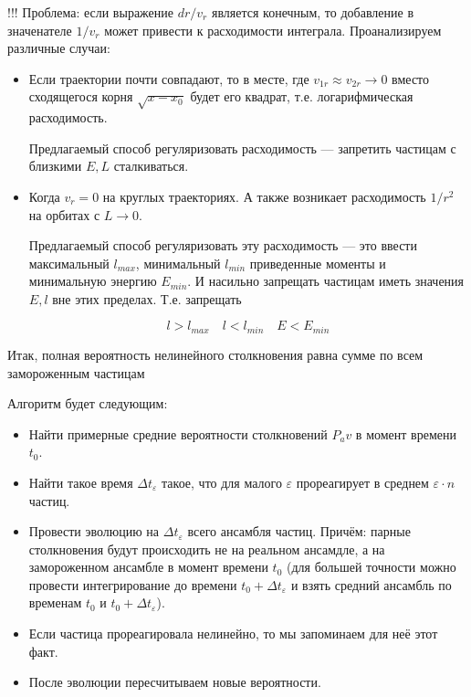 !!! Проблема: если выражение $dr/v_r$ является конечным, то добавление в значенателе $1/v_r$ может привести к расходимости интеграла.
Проанализируем различные случаи:

\begin{itemize}
	\item Если траектории почти совпадают, то в месте, где $v_{1r} \approx v_{2r} \to 0$ вместо сходящегося корня $\sqrt{x-x_0}$ будет его квадрат, т.е. логарифмическая расходимость. 
	
	Предлагаемый способ регуляризовать расходимость --- запретить частицам с близкими $E,L$ 
	сталкиваться. 
	
	\item Когда $
	v_r = 0$ на круглых траекториях. А также возникает расходимость $1/r^2$ на орбитах с $L \to 0$.

	Предлагаемый способ регуляризовать эту расходимость --- это ввести максимальный $l_{max}$, минимальный $l_{min}$ приведенные моменты и минимальную энергию $E_{min}$. И насильно запрещать частицам иметь значения $E,l$ вне этих пределах. Т.е. запрещать

	\[
		l > l_{max} \quad l < l_{min} \quad E < E_{min}
	\]

\end{itemize}

Итак, полная вероятность нелинейного столкновения равна сумме по всем замороженным частицам

Алгоритм будет следующим:
\begin{itemize}
	\item Найти примерные средние вероятности столкновений $P_av$ в момент времени $t_0$.
	\item Найти такое время $\Delta t_{\varepsilon}$ такое, что для малого $\varepsilon$ прореагирует в среднем $\varepsilon \cdot n$ частиц.
	\item Провести эволюцию на $\Delta t_{\varepsilon}$ всего ансамбля частиц. Причём: парные столкновения будут происходить не на реальном ансамдле, а на замороженном ансамбле в момент времени $t_0$ (для большей точности можно провести интегрирование до времени $t_0 + \Delta t_{\varepsilon}$ и взять средний ансамбль по временам $t_0$ и $t_0 + \Delta t_{\varepsilon}$).
	\item Если частица прореагировала нелинейно, то мы запоминаем для неё этот факт.
	\item После эволюции пересчитываем новые вероятности.
\end{itemize}


